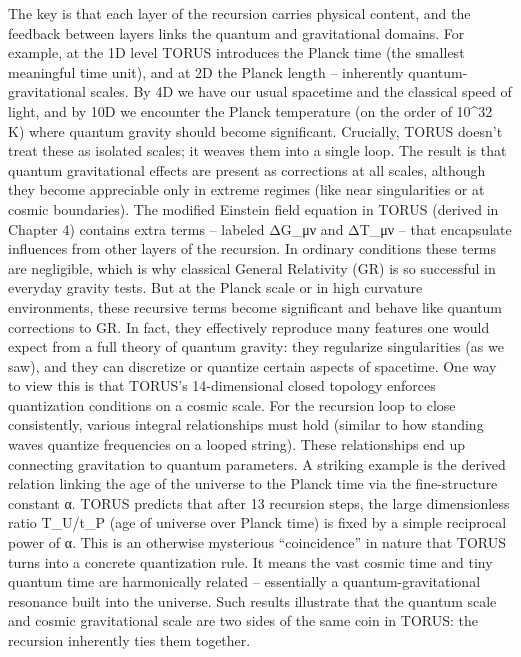 \documentclass[]{article}
\begin{document}
The key is that each layer of the recursion carries physical content,
and the feedback between layers links the quantum and gravitational
domains. For example, at the 1D level TORUS introduces the Planck time
(the smallest meaningful time unit), and at 2D the Planck length --
inherently quantum-gravitational scales. By 4D we have our usual
spacetime and the classical speed of light, and by 10D we encounter the
Planck temperature (on the order of 10\^{}32 K) where quantum gravity
should become significant. Crucially, TORUS doesn't treat these as
isolated scales; it weaves them into a single loop. The result is that
quantum gravitational effects are present as corrections at all scales,
although they become appreciable only in extreme regimes (like near
singularities or at cosmic boundaries). The modified Einstein field
equation in TORUS (derived in Chapter 4) contains extra terms -- labeled
ΔG\_μν and ΔT\_μν -- that encapsulate influences from other layers of
the recursion. In ordinary conditions these terms are negligible, which
is why classical General Relativity (GR) is so successful in everyday
gravity tests. But at the Planck scale or in high curvature
environments, these recursive terms become significant and behave like
quantum corrections to GR. In fact, they effectively reproduce many
features one would expect from a full theory of quantum gravity: they
regularize singularities (as we saw), and they can discretize or
quantize certain aspects of spacetime. One way to view this is that
TORUS's 14-dimensional closed topology enforces quantization conditions
on a cosmic scale. For the recursion loop to close consistently, various
integral relationships must hold (similar to how standing waves quantize
frequencies on a looped string). These relationships end up connecting
gravitation to quantum parameters. A striking example is the derived
relation linking the age of the universe to the Planck time via the
fine-structure constant α. TORUS predicts that after 13 recursion steps,
the large dimensionless ratio T\_U/t\_P (age of universe over Planck
time) is fixed by a simple reciprocal power of α. This is an otherwise
mysterious ``coincidence'' in nature that TORUS turns into a concrete
quantization rule. It means the vast cosmic time and tiny quantum time
are harmonically related -- essentially a quantum-gravitational
resonance built into the universe. Such results illustrate that the
quantum scale and cosmic gravitational scale are two sides of the same
coin in TORUS: the recursion inherently ties them together.
\end{document}
